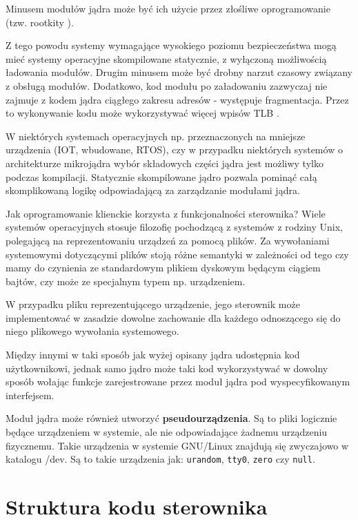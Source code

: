 \documentclass[shortabstract,inz]{iithesis}
\begin{document}
Minusem modułów jądra może być ich użycie przez złośliwe oprogramowanie (tzw. rootkity \cite{rootkits}). 

Z tego powodu systemy wymagające wysokiego poziomu 
bezpieczeństwa mogą mieć systemy operacyjne skompilowane statycznie, z wyłączoną 
możliwością ładowania modułów.
Drugim minusem może być drobny narzut czasowy związany z obsługą modułów.
Dodatkowo, kod modułu po załadowaniu zazwyczaj nie zajmuje z kodem jądra ciągłego
zakresu adresów - występuje fragmentacja. Przez to wykonywanie kodu może wykorzystywać więcej wpisów TLB \cite{wiki:lkm}.

W niektórych systemach operacyjnych np. przeznaczonych na mniejsze urządzenia (IOT, wbudowane, RTOS),
czy w przypadku niektórych systemów o architekturze mikrojądra
wybór składowych części jądra jest możliwy tylko podczas kompilacji. Statycznie skompilowane jądro
pozwala pominąć całą skomplikowaną logikę odpowiadającą za zarządzanie modułami jądra.

Jak oprogramowanie klienckie korzysta z funkcjonalności sterownika?
Wiele systemów operacyjnych stosuje filozofię pochodzącą z systemów z rodziny Unix,
polegającą na reprezentowaniu urządzeń za pomocą plików. 
Za wywołaniami systemowymi dotyczącymi plików stoją różne semantyki w zależności od tego
czy mamy do czynienia ze standardowym plikiem dyskowym będącym ciągiem bajtów, czy może ze
specjalnym typem np. urządzeniem.

W przypadku pliku reprezentującego urządzenie, jego sterownik może implementować w 
zasadzie dowolne zachowanie dla każdego odnoszącego się do niego plikowego wywołania systemowego.

Między innymi w taki sposób jak wyżej opisany jądra udostępnia kod użytkownikowi, 
jednak samo jądro może taki kod wykorzystywać w dowolny sposób wołając funkcje 
zarejestrowane przez moduł jądra pod wyspecyfikowanym interfejsem.

Moduł jądra może również utworzyć \textbf{pseudourządzenia}.
Są to pliki logicznie będące urządzeniem w systemie, ale nie odpowiadające 
żadnemu urządzeniu fizycznemu.
Takie urządzenia w systemie GNU/Linux znajdują się zwyczajowo w katalogu /dev.
Są to takie urządzenia jak: \texttt{urandom}, \texttt{tty0}, \texttt{zero} czy \texttt{null}.

\section{Struktura kodu sterownika} %
\end{document}
